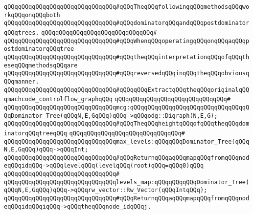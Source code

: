 \newline
\verb|qQQqqQQqqQQqqQQqqQQqqQQqqQQqqQQq#qQQqTheqQQqfollowingqQQqmethodsqQQqworkqQQqonqQQqboth|\newline
\verb|qQQqqQQqqQQqqQQqqQQqqQQqqQQqqQQq#qQQqdominatorqQQqandqQQqpostdominatorqQQqtrees.|\newline
\verb|qQQqqQQqqQQqqQQqqQQqqQQqqQQqqQQq#|\newline
\verb|qQQqqQQqqQQqqQQqqQQqqQQqqQQqqQQq#qQQqWhenqQQqoperatingqQQqonqQQqaqQQqpostdominatorqQQqtree|\newline
\verb|qQQqqQQqqQQqqQQqqQQqqQQqqQQqqQQq#qQQqtheqQQqinterpretationqQQqofqQQqtheseqQQqmethodsqQQqare|\newline
\verb|qQQqqQQqqQQqqQQqqQQqqQQqqQQqqQQq#qQQqreversedqQQqinqQQqtheqQQqobviousqQQqmanner.|\newline
\newline
\newline
\verb|qQQqqQQqqQQqqQQqqQQqqQQqqQQqqQQq#qQQqqQQqExtractqQQqtheqQQqoriginalqQQqmachcode_controlflow_graphqQQq|\newline
\verb|qQQqqQQqqQQqqQQqqQQqqQQqqQQqqQQq#|\newline
\verb|qQQqqQQqqQQqqQQqqQQqqQQqqQQqqQQqmcg:qQQqqQQqqQQqqQQqqQQqqQQqqQQqqQQqqQQqDominator_Tree(qQQqN,E,GqQQq)qQQq->qQQqodg::Digraph(N,E,G);|\newline
\newline
\newline
\newline
\verb|qQQqqQQqqQQqqQQqqQQqqQQqqQQqqQQq#qQQqTheqQQqheightqQQqofqQQqtheqQQqdominatorqQQqtreeqQQq|\newline
\verb|qQQqqQQqqQQqqQQqqQQqqQQqqQQqqQQq#|\newline
\verb|qQQqqQQqqQQqqQQqqQQqqQQqqQQqqQQqmax_levels:qQQqqQQqDominator_Tree(qQQqN,E,GqQQq)qQQq->qQQqInt;|\newline
\newline
\newline
\verb|qQQqqQQqqQQqqQQqqQQqqQQqqQQqqQQq#qQQqReturnqQQqaqQQqmapqQQqfromqQQqnodeqQQqidqQQq->qQQqlevelqQQq(levelqQQq(root)qQQq=qQQq0)qQQq|\newline
\verb|qQQqqQQqqQQqqQQqqQQqqQQqqQQqqQQq#|\newline
\verb|qQQqqQQqqQQqqQQqqQQqqQQqqQQqqQQqlevels_map:qQQqqQQqqQQqDominator_Tree(qQQqN,E,GqQQq)qQQq->qQQqrw_vector::Rw_Vector(qQQqIntqQQq);|\newline
\newline
\newline
\verb|qQQqqQQqqQQqqQQqqQQqqQQqqQQqqQQq#qQQqReturnqQQqaqQQqmapqQQqfromqQQqnodeqQQqidqQQqiqQQq->qQQqtheqQQqnode_idqQQqj,|\newline
